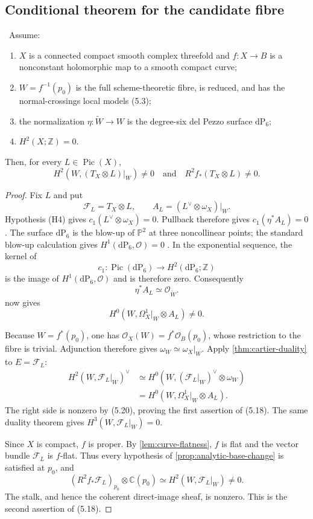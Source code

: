 \subsection{Conditional theorem for the candidate fibre}

\begin{theorem}
\label{thm:candidate-conductor}
\Conditional\ Assume:
\begin{enumerate}[label=(H\arabic*)]
\item $X$ is a connected compact smooth complex threefold and
$f:X\to B$ is a nonconstant holomorphic map to a smooth compact curve;
\item $W=f^{-1}(p_0)$ is the full scheme-theoretic fibre, is reduced, and
has the normal-crossings local models (5.3);
\item the normalization $\eta:\widetilde W\to W$ is the degree-six del
Pezzo surface $\mathrm{dP}_6$;
\item $H^2(X;\mathbb Z)=0$.
\end{enumerate}
Then, for every $L\in\operatorname{Pic}(X)$,
\[
H^2(W,(T_X\otimes L)|_W)\ne0
\quad\text{and}\quad
R^2f_*(T_X\otimes L)\ne0.
\tag{5.18}
\]
\end{theorem}

\begin{proof}
Fix $L$ and put
\[
\mathcal F_L=T_X\otimes L,\qquad
A_L=(L^\vee\otimes\omega_X)|_W.
\]
Hypothesis (H4) gives $c_1(L^\vee\otimes\omega_X)=0$.  Pullback therefore
gives $c_1(\eta^*A_L)=0$.  The surface $\mathrm{dP}_6$ is the blow-up of
$\mathbb P^2$ at three noncollinear points; the standard blow-up calculation
gives $H^1(\mathrm{dP}_6,\mathcal O)=0$
\cite[Chapter~V]{Hartshorne1977}.  In the exponential sequence, the kernel
of
\[
c_1:\operatorname{Pic}(\mathrm{dP}_6)\longrightarrow
H^2(\mathrm{dP}_6;\mathbb Z)
\]
is the image of $H^1(\mathrm{dP}_6,\mathcal O)$ and is therefore zero.
Consequently
\[
\eta^*A_L\simeq\mathcal O_{\widetilde W}.
\tag{5.19}
\]
 now gives
\[
H^0(W,\Omega^1_X|_W\otimes A_L)\ne0.
\tag{5.20}
\]

Because $W=f^*(p_0)$, one has
$\mathcal O_X(W)=f^*\mathcal O_B(p_0)$, whose restriction to the fibre is
trivial.  Adjunction therefore gives $\omega_W\simeq\omega_X|_W$.
Apply \cref{thm:cartier-duality} to $E=\mathcal F_L$:
\[
\begin{split}
H^2(W,\mathcal F_L|_W)^\vee
&\simeq H^0(W,(\mathcal F_L|_W)^\vee\otimes\omega_W)\\
&=H^0(W,\Omega^1_X|_W\otimes A_L).
\end{split}
\]
The right side is nonzero by (5.20), proving the first assertion of (5.18).
The same duality theorem gives
$H^3(W,\mathcal F_L|_W)=0$.

Since $X$ is compact, $f$ is proper.  By
\cref{lem:curve-flatness}, $f$ is flat and the vector bundle
$\mathcal F_L$ is $f$-flat.  Thus every hypothesis of
\cref{prop:analytic-base-change} is satisfied at $p_0$, and
\[
(R^2f_*\mathcal F_L)_{p_0}\otimes\mathbb C(p_0)
\simeq H^2(W,\mathcal F_L|_W)\ne0.
\]
The stalk, and hence the coherent direct-image sheaf, is nonzero.  This is
the second assertion of (5.18).
\end{proof}

